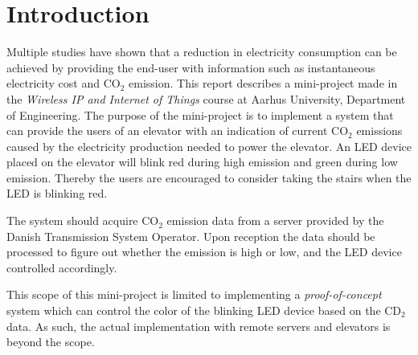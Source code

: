 \documentclass[Main]{subfiles}
\begin{document}
\section{Introduction} %
\label{sec:introduction}
	Multiple studies have shown that a reduction in electricity consumption can be achieved by providing the end-user with information such as instantaneous electricity cost and CO$_2$ emission\cite{Tricascade:2009:Online}. 
	This report describes a mini-project made in the \emph{Wireless IP and Internet of Things} course at Aarhus University, Department of Engineering. 
	The purpose of the mini-project is to implement a system that can provide the users of an elevator with an indication of current CO$_2$ emissions caused by the electricity production needed to power the elevator. 
	An LED device placed on the elevator will blink red during high emission and green during low emission. 
	Thereby the users are encouraged to consider taking the stairs when the LED is blinking red. 

	The system should acquire CO$_2$ emission data from a server provided by the Danish Transmission System Operator. 
	Upon reception the data should be processed to figure out whether the emission is high or low, and the LED device controlled accordingly.

	This scope of this mini-project is limited to implementing a \emph{proof-of-concept} system which can control the color of the blinking LED device based on the CD$_2$ data.
	As such, the actual implementation with remote servers and elevators is beyond the scope.



\end{document}
